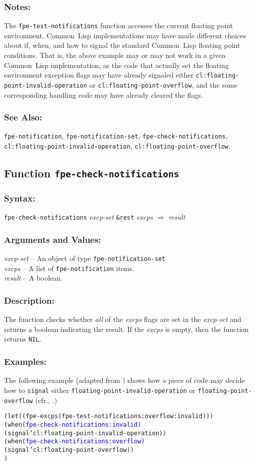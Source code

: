 \documentclass[10pt,fleqn]{article}
\newcommand{\CL}{\textsf{Common~Lisp}}
\newcommand{\code}[1]{\texttt{#1}}
\newcommand{\varname}[1]{\textit{#1}}
\newcommand{\DDictionaryItem}[1]{\vspace*{6pt}\noindent\hrulefill\vspace*{-9pt}\subsection*{#1}}
\newcommand{\DSyntax}{\subsubsection*{Syntax:}}
\newcommand{\DArgsNValues}{\subsubsection*{Arguments and Values:}}
\newcommand{\DDescription}{\subsubsection*{Description:}}
\newcommand{\DExamples}{\subsubsection*{Examples:}}
\newcommand{\DNotes}{\subsubsection*{Notes:}}
\newcommand{\DSeeAlso}{\subsubsection*{See Also:}}
\begin{document}
\DNotes{}

The \code{fpe-test-notifications} function accesses the current floating
point environment.  \CL{} implementations may have made different
choices about if, when, and how to signal the standard \CL{} floating
point conditions.  That is, the above example may or may not work in a
given \CL{} implementation, as the code that actually set the floating
environment exception flags may have already signaled either
\code{cl:floating-point-invalid-operation} or
\code{cl:floating-point-overflow}, and the some corresponding handling
code may have already cleared the flags.

\DSeeAlso{}

\code{fpe-notification}, \code{fpe-notification-set},
\code{fpe-check-notifications},\\
\code{cl:floating-point-invalid-operation},
\code{cl:floating-point-overflow}.


\DDictionaryItem{Function \code{fpe-check-notifications}}
\index{F!\code{fpe-check-notifications}}

\DSyntax{}

\code{fpe-check-notifications} \varname{excp-set} \code{\&rest} \varname{excps}
$\Rightarrow$ \varname{result}

\DArgsNValues{}

\varname{excp-set} -- An object of type \code{fpe-notification-set}\\
\varname{excps} -- A list of \code{fpe-notification} items.\\
\varname{result} -- A boolean.

\DDescription{}

The function checks whether \emph{all} of the \varname{excps} flags
are set in the \varname{excp-set} and returns a boolean indicating the
result.  If the \varname{excps} is empty, then the function returns
\code{NIL}.

\DExamples{}

The following example (adapted from \cite{2018:C18}) shows how a piece of
code may decide how to \code{signal} either
\code{floating-point-invalid-operation} or
\code{floating-point-overflow} (cfr., \cite{1996:ANSIHyperSpec}.)

\begin{alltt}
(let ((fpe-excps (fpe-test-notifications :overflow :invalid)))
   (when \textcolor{blue}{(fpe-check-notifications :invalid)}
     (signal 'cl:floating-point-invalid-operation))
   (when \textcolor{blue}{(fpe-check-notifications :overflow)}
     (signal 'cl:floating-point-overflow))
   )
\end{alltt}
\end{document}
